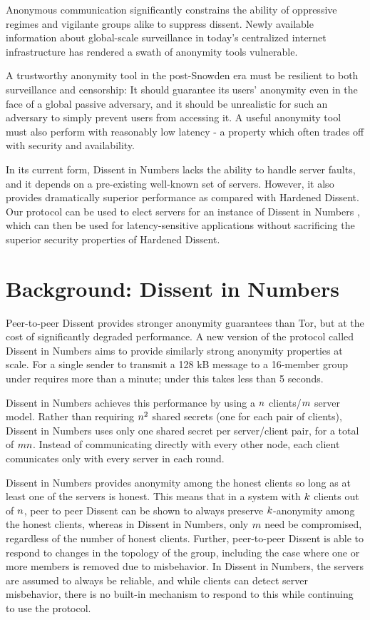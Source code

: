 Anonymous communication significantly constrains the ability of oppressive
regimes and vigilante groups alike to suppress dissent. Newly available
information about global-scale surveillance in today's
centralized internet infrastructure has rendered a swath of anonymity tools
vulnerable.

A trustworthy anonymity tool in the post-Snowden era must be resilient to both
surveillance and censorship: It should guarantee its users' anonymity even in
the face of a global passive adversary, and it should be unrealistic for such an
adversary to simply prevent users from accessing it. A useful anonymity tool
must also perform with reasonably low latency - a property which often trades
off with security and availability.

In its current form, Dissent in Numbers lacks the ability to handle server
faults, and it depends on a pre-existing well-known set of servers. However, it
also provides dramatically superior performance as compared with Hardened
Dissent.
Our protocol can be used to elect servers for an instance of Dissent in
Numbers \cite{din}, which can then be used for latency-sensitive applications
without sacrificing the superior security properties of Hardened Dissent.


\section{Background: Dissent in Numbers}
  Peer-to-peer Dissent provides stronger anonymity guarantees than Tor, but at
  the cost of significantly degraded performance. A new version of the
  protocol called Dissent in Numbers \cite{din} aims to provide similarly
  strong anonymity properties at scale. For a single sender to transmit a 128
  kB message to a 16-member group under \cite{p2pd} requires more than a
  minute; under \cite{din} this takes less than 5 seconds.

  Dissent in Numbers achieves this performance by using a $n$
  clients/$m$ server model.
  Rather than requiring $ n^2$ shared secrets (one for each pair of
  clients), Dissent in Numbers uses only one shared secret per server/client
  pair, for a total of $mn$. Instead of communicating
  directly with every other node, each client comunicates only with every
  server in each round.

  Dissent in Numbers provides anonymity among the honest clients so long as at
  least one of the servers is honest. This means that in a system with
  $k$ clients out of $n$, peer to peer Dissent can be shown
  to always preserve $k$-anonymity among the honest clients, whereas
  in Dissent in Numbers, only $m$ need be compromised, regardless of
  the number of honest clients. Further, peer-to-peer Dissent is able to
  respond to changes in the topology of the group, including the case where
  one or more members is removed due to misbehavior. In Dissent in Numbers,
  the servers are assumed to always be reliable, and while clients can detect
  server misbehavior, there is no built-in mechanism to respond to this while
  continuing to use the protocol.

